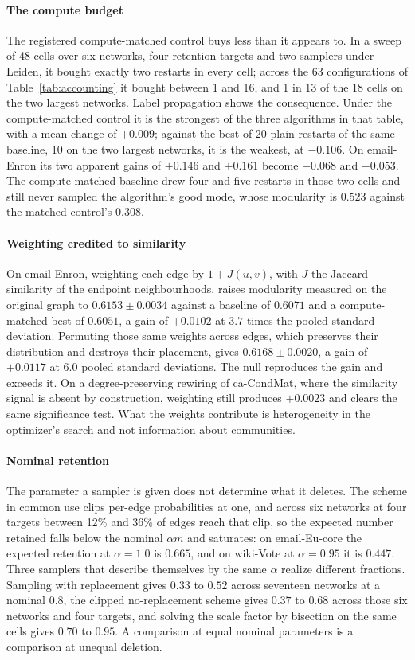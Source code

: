 \paragraph{The compute budget}
The registered compute-matched control buys less than it appears to. In a sweep
of 48 cells over six networks, four retention targets and two samplers under
Leiden, it bought exactly two restarts in every cell; across the 63
configurations of Table~\ref{tab:accounting} it bought between 1 and 16, and 1 in
13 of the 18 cells on the two largest networks. Label propagation shows the
consequence. Under the compute-matched control it is the strongest of the three
algorithms in that table, with a mean change of $+0.009$; against the best of 20
plain restarts of the same baseline, 10 on the two largest networks, it is the
weakest, at $-0.106$. On email-Enron its two apparent gains of $+0.146$ and
$+0.161$ become $-0.068$ and $-0.053$. The compute-matched baseline drew four and
five restarts in those two cells and still never sampled the algorithm's good
mode, whose modularity is $0.523$ against the matched control's $0.308$.

\paragraph{Weighting credited to similarity}
On email-Enron, weighting each edge by $1 + J(u,v)$, with $J$ the Jaccard
similarity of the endpoint neighbourhoods, raises modularity measured on the
original graph to $0.6153 \pm 0.0034$ against a baseline of $0.6071$ and a
compute-matched best of $0.6051$, a gain of $+0.0102$ at $3.7$ times the pooled
standard deviation. Permuting those same weights across edges, which preserves
their distribution and destroys their placement, gives $0.6168 \pm 0.0020$, a
gain of $+0.0117$ at $6.0$ pooled standard deviations. The null reproduces the
gain and exceeds it. On a degree-preserving rewiring of ca-CondMat, where the
similarity signal is absent by construction, weighting still produces $+0.0023$
and clears the same significance test. What the weights contribute is
heterogeneity in the optimizer's search and not information about communities.

\paragraph{Nominal retention}
The parameter a sampler is given does not determine what it deletes. The scheme
in common use clips per-edge probabilities at one, and across six networks at
four targets between 12\% and 36\% of edges reach that clip, so the expected
number retained falls below the nominal $\alpha m$ and saturates: on
email-Eu-core the expected retention at $\alpha = 1.0$ is $0.665$, and on
wiki-Vote at $\alpha = 0.95$ it is $0.447$. Three samplers that describe
themselves by the same $\alpha$ realize different fractions. Sampling with
replacement gives $0.33$ to $0.52$ across seventeen networks at a nominal $0.8$,
the clipped no-replacement scheme gives $0.37$ to $0.68$ across those six
networks and four targets, and solving the scale factor by bisection on the same
cells gives $0.70$ to $0.95$. A comparison at equal nominal parameters is a
comparison at unequal deletion.

